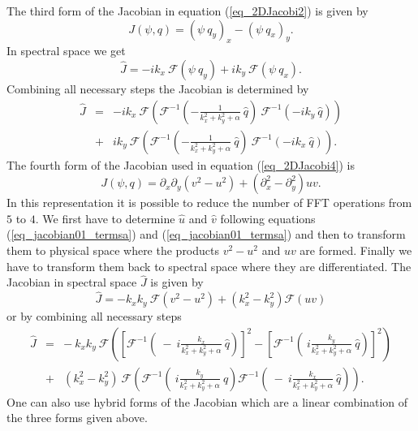 The third form of the Jacobian in equation (\ref{eq_2DJacobi2})
is given by
\begin{equation} \label{eq_jacobian03}
  J(\psi,q) = (\psi \ q_{y})_{x} - (\psi \ q_{x})_{y}.
\end{equation}
In spectral space we get 
\begin{equation} \label{eq_jacobian03_J}
  \hat{J} = -ik_{x} \ \mathcal{F}(\psi \ q_{y}) 
            +ik_{y} \ \mathcal{F}(\psi \ q_{x}).
\end{equation}
Combining all necessary steps the Jacobian is determined by
\begin{eqnarray} 
  \hat{J} 
   &=& 
 -ik_{x} \ 
  \mathcal{F}\left(
     \mathcal{F}^{-1} 
       \left(-\frac{1}{k_{x}^{2} + k_{y}^{2} + \alpha} \ \hat{q} \right) \
     \mathcal{F}^{-1}
       \left(
         -ik_{y} \ \hat{q}
       \right)
             \right) 
    \\ \label{eq_jacobian03_Jall}
   &+&
  ik_{y} \ 
  \mathcal{F}\left(
     \mathcal{F}^{-1} 
       \left(-\frac{1}{k_{x}^{2} + k_{y}^{2} + \alpha} \ \hat{q} \right) \
     \mathcal{F}^{-1}
       \left(
         -ik_{x} \ \hat{q}
       \right)
             \right).
\end{eqnarray}
The fourth form of the Jacobian used in equation (\ref{eq_2DJacobi4}) is \begin{equation} \label{eq_jacobian04}
  J(\psi,q)
   = 
  \partial_{x}\partial_{y} \left(v^{2} - u^{2} \right)
   +
  \left( \partial^{2}_{x} - \partial^{2}_{y} \right)  uv.
\end{equation}
In this representation it is possible to reduce the number of FFT
operations from $5$ to $4$. We first have to determine $\hat{u}$ 
and $\hat{v}$ following equations (\ref{eq_jacobian01_termsa}) and 
(\ref{eq_jacobian01_termsa}) and then to transform them to physical 
space where the products $v^{2} - u^{2}$ and $uv$ are formed.
Finally we have to transform them back to spectral space where they
are differentiated. The Jacobian in spectral space $\hat{J}$ is 
given by   
\begin{equation} \label{eq_jacobian04_J}
  \hat{J}
   = 
  -k_{x}k_{y} \ \mathcal{F}(v^{2} - u^{2})
   +
   \left( k^{2}_{x} - k^{2}_{y} \right) \mathcal{F}(uv)
\end{equation} 
or by combining all necessary steps
\begin{eqnarray} \nonumber
  \hat{J} 
   &=&
  - \ k_{x}k_{y} \ 
  \mathcal{F}
   \left(
    \left[ 
     \mathcal{F}^{-1} 
     \left(
      \ - \ i \frac{k_{x}}{k^{2}_{x}+k^{2}_{y}+\alpha} \ 
      \hat{q}
     \right) 
    \right]^{2}
       -
    \left[ 
     \mathcal{F}^{-1} 
      \left(
      \ i \frac{k_{y}}{k^{2}_{x}+k^{2}_{y}+\alpha} \ 
       \hat{q}
      \right) 
    \right]^{2}
   \right)
    \\ \label{eq_jacobian02_Jall}
   &+&
  \left( k^{2}_{x} - k^{2}_{y} \right) \ 
  \mathcal{F}
   \left(
    \mathcal{F}^{-1} 
     \left(
     \ i \frac{k_{y}}{k^{2}_{x}+k^{2}_{y}+\alpha} \ 
      \hat{q}
     \right) 
    \mathcal{F}^{-1} 
     \left(
      \ - \ i \frac{k_{x}}{k^{2}_{x}+k^{2}_{y}+\alpha} \ 
      \hat{q}
     \right) 
   \right).
\end{eqnarray}
One can also use hybrid forms of the Jacobian which are a linear 
combination of the three forms given above.
%
